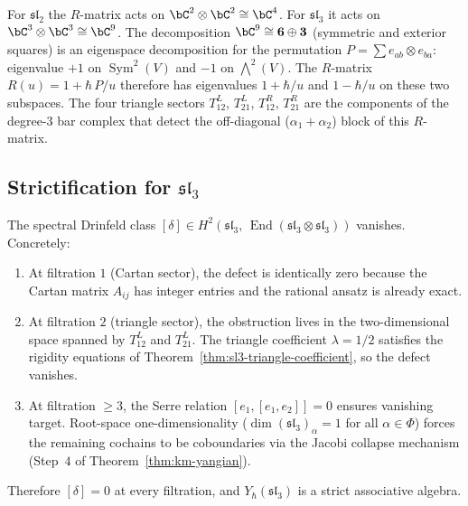 \begin{remark}
\label{rem:9x9-vs-4x4}
For $\mathfrak{sl}_2$ the $R$-matrix acts on
$\bC^2\otimes\bC^2\cong\bC^4$.
For $\mathfrak{sl}_3$ it acts on
$\bC^3\otimes\bC^3\cong\bC^9$.
The decomposition
$\bC^9\cong\mathbf{6}\oplus\mathbf{3}$
(symmetric and exterior squares) is an eigenspace decomposition
for the permutation $P=\sum e_{ab}\otimes e_{ba}$: eigenvalue
$+1$ on $\operatorname{Sym}^2(V)$ and $-1$ on $\bigwedge^2(V)$.
The $R$-matrix $R(u)=1+\hbar\,P/u$ therefore has eigenvalues
$1+\hbar/u$ and $1-\hbar/u$ on these two subspaces.
The four triangle sectors $T^L_{12}$, $T^L_{21}$, $T^R_{12}$, $T^R_{21}$
are the components of the degree-$3$ bar complex that detect the
off-diagonal ($\alpha_1+\alpha_2$) block of this $R$-matrix.
\end{remark}

\subsection{Strictification for \texorpdfstring{$\mathfrak{sl}_3$}{sl(3)}}

\begin{theorem}
\label{thm:sl3-strictification}
The spectral Drinfeld class $[\delta]\in H^2(\mathfrak{sl}_3,\,
\operatorname{End}(\mathfrak{sl}_3\otimes\mathfrak{sl}_3))$
vanishes. Concretely:
\begin{enumerate}[label=\textup{(\roman*)}]
\item At filtration $1$ \textup{(}Cartan sector\textup{)},
the defect is identically zero because the Cartan matrix $A_{ij}$
has integer entries and the rational ansatz is already exact.
\item At filtration $2$ \textup{(}triangle sector\textup{)},
the obstruction lives in the two-dimensional space spanned by
$T^L_{12}$ and $T^L_{21}$. The triangle coefficient
$\lambda=1/2$ satisfies the rigidity equations of
Theorem~\textup{\ref{thm:sl3-triangle-coefficient}}, so the
defect vanishes.
\item At filtration $\ge 3$, the Serre relation
$[e_1,[e_1,e_2]]=0$ ensures vanishing target.
Root-space one-dimensionality
\textup{(}$\dim(\mathfrak{sl}_3)_\alpha=1$ for all
$\alpha\in\Phi$\textup{)} forces the remaining cochains to be
coboundaries via the Jacobi collapse mechanism
\textup{(Step~$4$ of Theorem~\textup{\ref{thm:km-yangian}})}.
\end{enumerate}
Therefore $[\delta]=0$ at every filtration, and
$Y_\hbar(\mathfrak{sl}_3)$ is a strict associative algebra.
\end{theorem}

